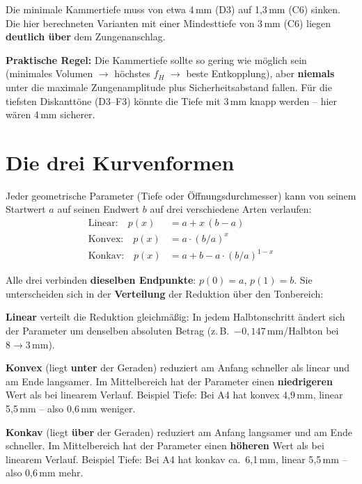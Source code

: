 \documentclass[11pt,a4paper]{article}
\begin{document}
Die minimale Kammertiefe muss von etwa 4\,mm (D3) auf 1{,}3\,mm (C6) sinken. Die hier berechneten Varianten mit einer Mindesttiefe von 3\,mm (C6) liegen \textbf{deutlich über} dem Zungenanschlag.

\begin{keybox}
\textbf{Praktische Regel:} Die Kammertiefe sollte so gering wie möglich sein (minimales Volumen $\to$ höchstes $f_H$ $\to$ beste Entkopplung), aber \textbf{niemals} unter die maximale Zungenamplitude plus Sicherheitsabstand fallen. Für die tiefsten Diskanttöne (D3--F3) könnte die Tiefe mit 3\,mm knapp werden -- hier wären 4\,mm sicherer.
\end{keybox}


\section{Die drei Kurvenformen}

Jeder geometrische Parameter (Tiefe oder Öffnungsdurchmesser) kann von seinem Startwert $a$ auf seinen Endwert $b$ auf drei verschiedene Arten verlaufen:
\begin{align}
\text{Linear:}\quad p(x) &= a + x\,(b - a) \\
\text{Konvex:}\quad p(x) &= a \cdot (b/a)^x \\
\text{Konkav:}\quad p(x) &= a + b - a \cdot (b/a)^{1-x}
\end{align}

Alle drei verbinden \textbf{dieselben Endpunkte}: $p(0) = a$, $p(1) = b$. Sie unterscheiden sich in der \textbf{Verteilung} der Reduktion über den Tonbereich:

\textbf{Linear} verteilt die Reduktion gleichmäßig: In jedem Halbtonschritt ändert sich der Parameter um denselben absoluten Betrag (z.\,B.\ $-0{,}147$\,mm/Halbton bei $8 \to 3$\,mm).

\textbf{Konvex} (liegt \textbf{unter} der Geraden) reduziert am Anfang schneller als linear und am Ende langsamer. Im Mittelbereich hat der Parameter einen \textbf{niedrigeren} Wert als bei linearem Verlauf. Beispiel Tiefe: Bei A4 hat konvex 4{,}9\,mm, linear 5{,}5\,mm -- also 0{,}6\,mm weniger.

\textbf{Konkav} (liegt \textbf{über} der Geraden) reduziert am Anfang langsamer und am Ende schneller. Im Mittelbereich hat der Parameter einen \textbf{höheren} Wert als bei linearem Verlauf. Beispiel Tiefe: Bei A4 hat konkav ca.\ 6{,}1\,mm, linear 5{,}5\,mm -- also 0{,}6\,mm mehr.
\end{document}
